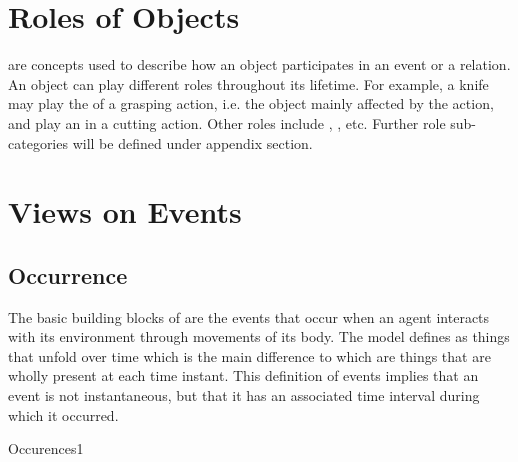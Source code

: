 \section{Roles of Objects}
\label{sec:narrative:roles}

 are concepts used to describe how an object participates in an event or a relation. An object can play different roles throughout its lifetime. For example, a knife may play the  of a grasping action, i.e. the object mainly affected by the action, and play an  in a cutting action. Other roles include , , %
etc. Further role sub-categories will be defined under appendix section. 


\section{Views on Events}
\label{sec:narrative:relations} 

\subsection{Occurrence}
\label{sec:occurrences}
The basic building blocks of \neems are the events that occur when an agent interacts with its environment through movements of its body.
The \neem model defines  as things that unfold over time which is the main difference to  which are things that are wholly present at each time instant.
This definition of events implies that an event is not instantaneous, but that it has an associated time interval during which it occurred.

\begin{ODP}{Occurences1}
\end{ODP}

